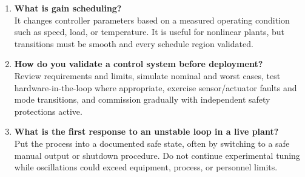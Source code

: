 \documentclass[11pt]{article}
\begin{document}
\begin{enumerate}
\item \textbf{What is gain scheduling?}\\
It changes controller parameters based on a measured operating condition such as speed, load, or temperature. It is useful for nonlinear plants, but transitions must be smooth and every schedule region validated.

\item \textbf{How do you validate a control system before deployment?}\\
Review requirements and limits, simulate nominal and worst cases, test hardware-in-the-loop where appropriate, exercise sensor/actuator faults and mode transitions, and commission gradually with independent safety protections active.

\item \textbf{What is the first response to an unstable loop in a live plant?}\\
Put the process into a documented safe state, often by switching to a safe manual output or shutdown procedure. Do not continue experimental tuning while oscillations could exceed equipment, process, or personnel limits.
\end{enumerate}
\end{document}
